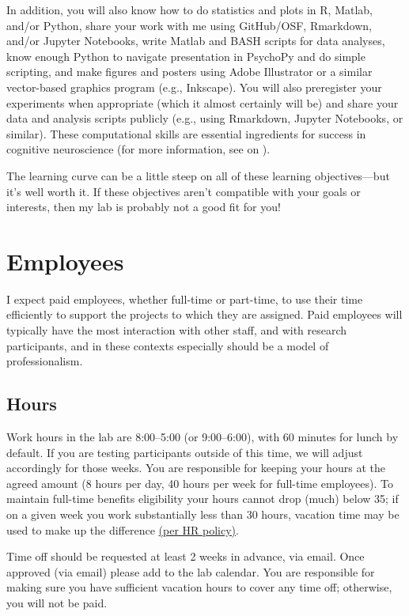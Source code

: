 \documentclass[letterpaper,12pt,oneside]{memoir}
\begin{document}
In addition, you will also know how to do statistics and plots in R, Matlab, and/or Python, share your work with me using GitHub/OSF, Rmarkdown, and/or Jupyter Notebooks, write Matlab and BASH scripts for data analyses, know enough Python to navigate presentation in PsychoPy and do simple scripting, and make figures and posters using Adobe Illustrator or a similar vector-based graphics program (e.g., Inkscape). You will also preregister your experiments when appropriate (which it almost certainly will be) and share your data and analysis scripts publicly (e.g., using Rmarkdown, Jupyter Notebooks, or similar). These computational skills are essential ingredients for success in cognitive neuroscience (for more information, see  on ).

The learning curve can be a little steep on all of these learning objectives---but it's well worth it. If these objectives aren't compatible with your goals or interests, then my lab is probably not a good fit for you!



\section{Employees}

I expect paid employees, whether full-time or part-time, to use their time efficiently to support the projects to which they are assigned. Paid employees will typically have the most interaction with other staff, and with research participants, and in these contexts especially should be a model of professionalism.

\subsection{Hours}
Work hours in the lab are 8:00--5:00 (or 9:00--6:00), with 60 minutes for lunch by default. If you are testing participants outside of this time, we will adjust accordingly for those weeks. You are responsible for keeping your hours at the agreed amount (8 hours per day, 40 hours per week for full-time employees). To maintain full-time benefits eligibility your hours cannot drop (much) below 35; if on a given week you work substantially less than 30 hours, vacation time may be used to make up the difference \href{http://www.temple.edu/hr/departments/employeerelations/documents/Employee_Manual_Feb_2016.pdf}{(per HR policy)}.

Time off should be requested at least 2 weeks in advance, via email. Once approved (via email) please add to the lab calendar. You are responsible for making sure you have sufficient vacation hours to cover any time off; otherwise, you will not be paid.
\end{document}
